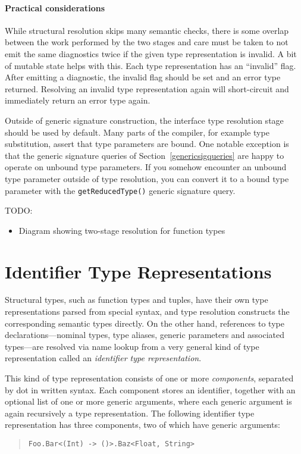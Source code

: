 \documentclass[a4paper,headsepline,bibliography=totoc,toc=flat,fleqn,twoside=semi]{scrbook}
\theoremstyle{definition}
\theoremstyle{definition}
\theoremstyle{definition}
\newcommand{\ifWIP}{\iffalse}
\begin{document}
\paragraph{Practical considerations}
While structural resolution skips many semantic checks, there is some overlap between the work performed by the two stages and care must be taken to not emit the same diagnostics twice if the given type representation is invalid. A bit of mutable state helps with this. Each type representation has an ``invalid'' flag. After emitting a diagnostic, the invalid flag should be set and an error type returned. Resolving an invalid type representation again will short-circuit and immediately return an error type again.

Outside of generic signature construction, the interface type resolution stage should be used by default. Many parts of the compiler, for example type substitution, assert that type parameters are bound. One notable exception is that the generic signature queries of Section~\ref{genericsigqueries} are happy to operate on unbound type parameters. If you somehow encounter an unbound type parameter outside of type resolution, you can convert it to a bound type parameter with the \texttt{getReducedType()} generic signature query.

TODO:
\begin{itemize}
\item Diagram showing two-stage resolution for function types
\end{itemize}
\fi

\section{Identifier Type Representations}\label{identtyperepr}

\ifWIP

Structural types, such as function types and tuples, have their own type representations parsed from special syntax, and type resolution constructs the corresponding semantic types directly. On the other hand, references to type declarations---nominal types, type aliases, generic parameters and associated types---are resolved via name lookup from a very general kind of type representation called an \emph{identifier type representation}.

This kind of type representation consists of one or more \emph{components}, separated by dot in written syntax. Each component stores an identifier, together with an optional list of one or more generic arguments, where each generic argument is again recursively a type representation. The following identifier type representation has three components, two of which have generic arguments:
\begin{quote}
\begin{verbatim}
Foo.Bar<(Int) -> ()>.Baz<Float, String>
\end{verbatim}
\end{quote}
\end{document}
